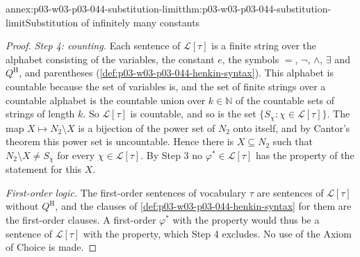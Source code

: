 \begin{annexitem}{annex:p03-w03-p03-044-substitution-limit}{thm:p03-w03-p03-044-substitution-limit}{Substitution of infinitely many constants}
\begin{proof}
\emph{Step 4: counting.}  Each sentence of \(\mathscr L[\tau]\) is a finite
string over the alphabet consisting of the variables, the constant \(e\),
the symbols \(=\), \(\neg\), \(\land\), \(\exists\) and \(Q^{\mathrm H}\), and
parentheses (\cref{def:p03-w03-p03-044-henkin-syntax}).  This alphabet is
countable because the set of variables is, and the set of finite strings
over a countable alphabet is the countable union over \(k\in\mathbb N\) of
the countable sets of strings of length \(k\).  So \(\mathscr L[\tau]\) is
countable, and so is the set \(\{S_\chi:\chi\in\mathscr L[\tau]\}\).  The
map \(X\mapsto N_2\setminus X\) is a bijection of the power set of \(N_2\)
onto itself, and by Cantor's theorem this power set is uncountable.  Hence
there is \(X\subseteq N_2\) such that \(N_2\setminus X\neq S_\chi\) for
every \(\chi\in\mathscr L[\tau]\).  By Step 3 no
\(\varphi^\ast\in\mathscr L[\tau]\) has the property of the statement for
this \(X\).

\emph{First-order logic.}  The first-order sentences of vocabulary \(\tau\)
are sentences of \(\mathscr L[\tau]\) without \(Q^{\mathrm H}\), and the
clauses of \cref{def:p03-w03-p03-044-henkin-syntax} for them are the
first-order clauses.  A first-order \(\varphi^\ast\) with the property would
thus be a sentence of \(\mathscr L[\tau]\) with the property, which Step 4
excludes.  No use of the Axiom of Choice is made.
\end{proof}
\end{annexitem}

